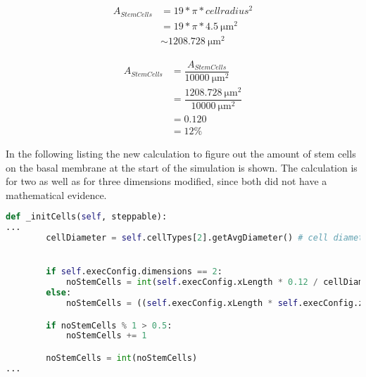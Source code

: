 \begin{equation}
\begin{split}
A_{StemCells} & = 19 * \pi *  cell radius^{2} \\
					& = 19 * \pi *  \SI{4.5}{\micro\metre^{2}}  \\
					& \sim \SI{1208.728}{\micro\metre^{2}}
\end{split}
\end{equation}

\begin{equation}
\begin{split}
A_{StemCells} & = \dfrac{A_{StemCells}}{\SI{10000}{\micro\metre^{2}}} \\
				& = \dfrac{\SI{1208.728}{\micro\metre^{2}}}{\SI{10000}{\micro\metre^{2}}} \\
				& = 0.120 \\
				& = 12\%
\end{split}
\end{equation}

In the following listing the new calculation to figure out the amount of stem cells on the basal membrane at the start of the simulation is shown. The calculation is for two as well as for three dimensions modified, since both did not have a mathematical evidence.

\begin{lstlisting}[language=Python, caption= new calculation of the amount of stem cells on the basal membrane with a mathematical evidence]
    def _initCells(self, steppable):
...
        cellDiameter = self.cellTypes[2].getAvgDiameter() # cell diameter is of type float


        if self.execConfig.dimensions == 2:
            noStemCells = int(self.execConfig.xLength * 0.12 / cellDiameter)
        else:
            noStemCells = ((self.execConfig.xLength * self.execConfig.zLength) * 0.12) / (PI * (cellDiameter / 2.) ** 2)

        if noStemCells % 1 > 0.5:
            noStemCells += 1

        noStemCells = int(noStemCells)
...
\end{lstlisting}

